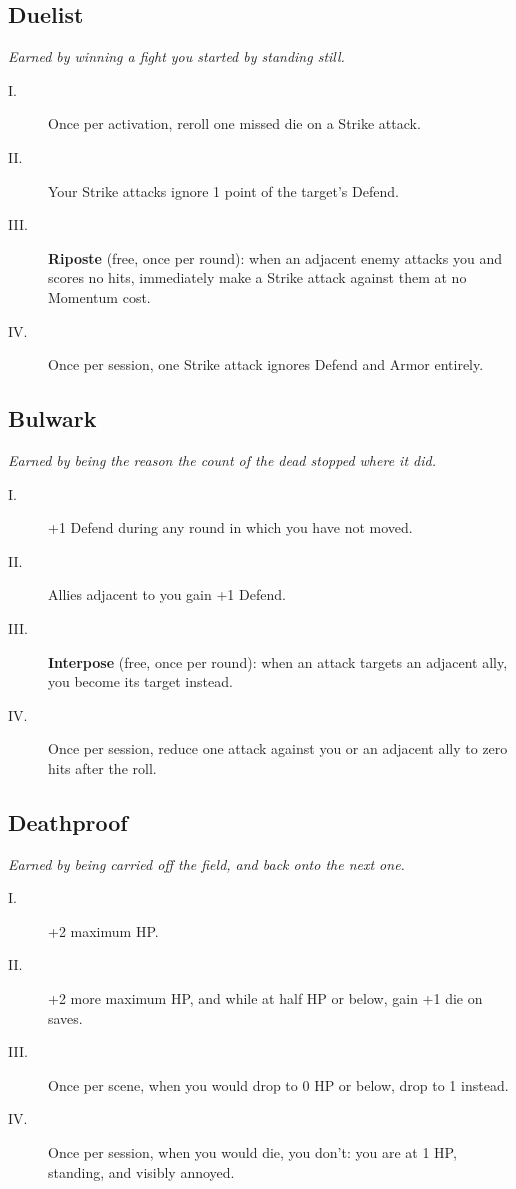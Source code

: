 \subsection{Duelist}
\textit{Earned by winning a fight you started by standing still.}
\begin{description}
    \item[I.] Once per activation, reroll one missed die on a Strike attack.
    \item[II.] Your Strike attacks ignore 1 point of the target's Defend.
    \item[III.] \textbf{Riposte} (free, once per round): when an adjacent enemy attacks you and scores no hits, immediately make a Strike attack against them at no Momentum cost.
    \item[IV.] Once per session, one Strike attack ignores Defend and Armor entirely.
\end{description}

\subsection{Bulwark}
\textit{Earned by being the reason the count of the dead stopped where it did.}
\begin{description}
    \item[I.] +1 Defend during any round in which you have not moved.
    \item[II.] Allies adjacent to you gain +1 Defend.
    \item[III.] \textbf{Interpose} (free, once per round): when an attack targets an adjacent ally, you become its target instead.
    \item[IV.] Once per session, reduce one attack against you or an adjacent ally to zero hits after the roll.
\end{description}

\subsection{Deathproof}
\textit{Earned by being carried off the field, and back onto the next one.}
\begin{description}
    \item[I.] +2 maximum HP.
    \item[II.] +2 more maximum HP, and while at half HP or below, gain +1 die on saves.
    \item[III.] Once per scene, when you would drop to 0 HP or below, drop to 1 instead.
    \item[IV.] Once per session, when you would die, you don't: you are at 1 HP, standing, and visibly annoyed.
\end{description}

